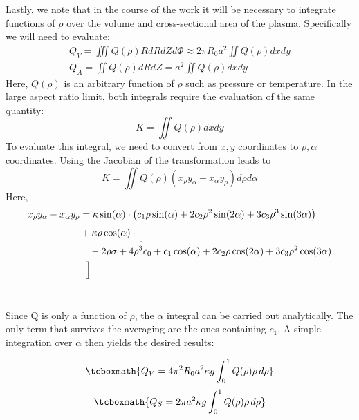 Lastly, we note that in the course of the work it will be necessary to integrate functions of $\rho$ over the volume and cross-sectional area of the plasma. Specifically we will need to evaluate:
\begin{gather}
	Q_V = \iiint Q(\rho) R dR dZ d\Phi \approx 2 \pi R_0 a^2 \iint Q(\rho) dx dy \\
	Q_A = \iint Q(\rho) dR dZ = a^2 \iint Q(\rho) dx dy
\end{gather}
Here, $Q(\rho)$ is an arbitrary function of $\rho$ such as pressure or temperature. In the large aspect ratio limit, both integrals require the evaluation of the same quantity:
\begin{equation}
	K = \iint Q(\rho) dx dy
\end{equation}
To evaluate this integral, we need to convert from $x, y$ coordinates to $\rho, \alpha$ coordinates. Using the Jacobian of the transformation leads to
\begin{equation}
	K = \iint Q(\rho) (x_\rho y_\alpha - x_\alpha y_\rho ) d\rho d\alpha
\end{equation}
Here, ~
\begin{equation}
\begin{split}
	\small
	x_\rho y_\alpha - x_\alpha y_\rho & = \kappa \sin(\alpha) \cdot \left( c_1 \rho \sin(\alpha) + 2 c_2 \rho^2 \sin(2\alpha)  + 3 c_3 \rho^3 \sin(3\alpha)  \right) \\
		& + \kappa \rho \cos(\alpha) \cdot \Big[ \\
		& \ \ \ -2 \rho \sigma + 4 \rho^3 c_0 + c_1 \cos(\alpha) + 2 c_2 \rho \cos(2\alpha) + 3 c_3 \rho^2 \cos(3\alpha) \\
		& \ \ \Big]
\end{split}
\end{equation} ~ 

Since Q is only a function of $\rho$, the $\alpha$ integral can be carried out analytically. The only term that survives the averaging are the ones containing $c_1$. A simple integration over $\alpha$ then yields the desired results:

\begin{equation}
  	\label{eq:qv}
  	\tcboxmath{
 	Q_V = 4 \pi^2 R_0 a^2 \kappa g \int_0^1 Q(\rho) \rho \, d\rho
 	}
\end{equation}
\begin{equation}
	\label{eq:qs}
  	\tcboxmath{
	Q_S = 2 \pi a^2 \kappa g \int_0^1 Q(\rho) \rho \, d\rho
	}
\end{equation}
